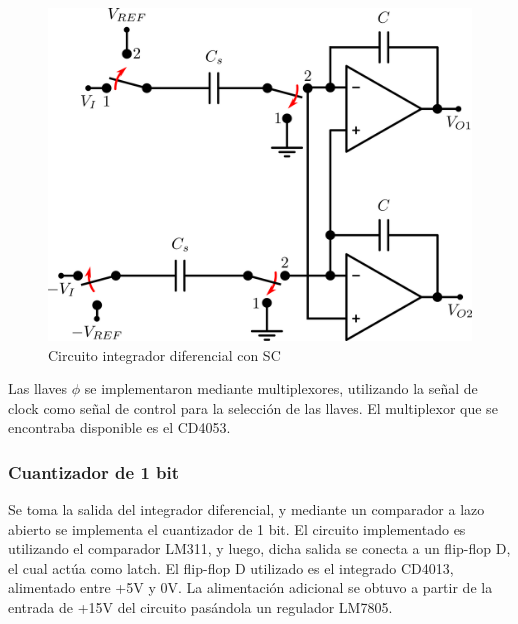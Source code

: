 \documentclass[assd_tp3_main.tex]{subfiles}
\begin{document}
\begin{figure}[!ht]
\begin{centering}
\includegraphics[scale=0.45]{images/ej5/IntegradorDifSC.png}
\par\end{centering}
\caption{Circuito integrador diferencial con SC}
\end{figure}

Las llaves $\phi$ se implementaron mediante multiplexores, utilizando la señal de clock como señal de control para la selección de las llaves. El multiplexor que se encontraba disponible es el CD4053.

\subsubsection{Cuantizador de 1 bit}

Se toma la salida del integrador diferencial, y mediante un comparador a lazo abierto se implementa el cuantizador de 1 bit. El circuito implementado es utilizando el comparador LM311, y luego, dicha salida se conecta a un flip-flop D, el cual actúa como latch. El flip-flop D utilizado es el integrado CD4013, alimentado entre +5V y 0V. La alimentación adicional se obtuvo a partir de la entrada de +15V del circuito pasándola un regulador LM7805.
\end{document}

